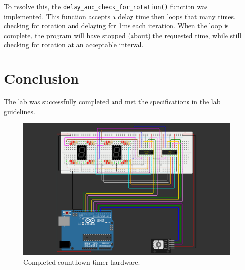 \documentclass[fleqn]{article}
\begin{document}
\vspace{0.15cm}
To resolve this, the \verb|delay_and_check_for_rotation()| function was implemented. This function accepts a delay time then loops that many times, checking for rotation and delaying for 1ms each iteration. When the loop is complete, the program will have stopped (about) the requested time, while still checking for rotation at an acceptable interval.

\section*{Conclusion}
The lab was successfully completed and met the specifications in the lab guidelines. 
    \begin{figure}[H]
        \centering
        \includegraphics[width=5in]{circut.png}
        \caption{Completed countdown timer hardware.}
    \end{figure}
\end{document}
